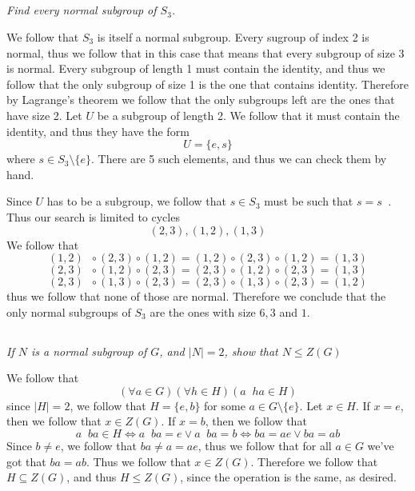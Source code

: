 \documentclass[11pt,oneside,titlepage]{book}
\DeclareMathOperator \inv {^{-1}}
\DeclareMathOperator \lra {\Leftrightarrow}
\newcommand{\set}[1]{\{ #1 \}}
\begin{document}
\subsection{}

\textit{Find every normal subgroup of $S_3$.}

We follow that $S_3$ is itself  a normal subgroup. Every sugroup of index 2 is normal,
thus we follow that in this case that means that every subgroup of size 3 is normal.
Every subgroup of length 1 must contain the identity, and thus we follow  that the
only subgroup of size 1 is the one that contains identity. Therefore by
Lagrange's theorem we follow that the only subgroups left are the ones that have size 2.
Let $U$ be a subgroup of length 2. We follow that it must contain the identity,
and thus they have the form
$$U  = \set{e, s}$$
where $s \in S_3 \setminus \set{e}$. There are 5 such elements, and thus we can check them
by hand.

Since $U$ has to be a subgroup, we follow that $s \in S_3$ must be such that
$s = s \inv$. Thus our search is limited to cycles
$$(2, 3), (1, 2), (1, 3)$$
We follow that
$$(1, 2)\inv \circ (2, 3) \circ (1, 2) = (1, 2) \circ (2, 3) \circ (1, 2) = (1, 3)$$
$$(2, 3)\inv \circ (1, 2) \circ (2, 3) = (2, 3) \circ (1, 2) \circ (2, 3) = (1, 3)$$
$$(2, 3)\inv \circ (1, 3) \circ (2, 3) = (2, 3) \circ (1, 3) \circ (2, 3) = (1, 2)$$
thus we follow that none of those are normal. Therefore we conclude that the only normal
subgroups of $S_3$ are the ones with size $6, 3$ and $1$.

\subsection{}

\textit{If $N$ is a normal subgroup of $G$, and $|N| = 2$, show that $N \leq Z(G)$}

We follow that
$$(\forall a \in G)(\forall h \in H)(a\inv h a \in H)$$
since $|H| = 2$, we follow that $H = \set{e, b}$ for some $a \in G \setminus \set{e}$.
Let $x \in H$.  If $x = e$, then we follow that $x \in Z(G)$. If $x = b$, then we follow that
$$a\inv b a \in H \lra a\inv b a = e \lor a\inv b a = b \lra
b a = a e \lor b a = a b$$
Since $b \neq e$, we follow that $ba \neq a = ae$, thus we follow that for all $a \in G$
we've got that $ba = ab$. Thus we follow that $x \in Z(G)$. Therefore we follow that
$H \subseteq Z(G)$, and thus $H \leq Z(G)$, since the operation is the same, as desired.

\subsection{}
\end{document}
